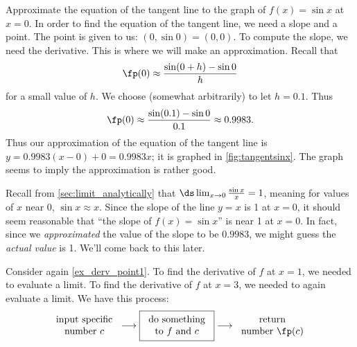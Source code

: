 \begin{example}\label{ex_der_num_approx}
Approximate the equation of the tangent line to the graph of $f(x)=\sin x$ at $x=0$.
\solution
In order to find the equation of the tangent line, we need a slope and a point. The point is given to us: $(0,\sin 0) = (0,0)$. To compute the slope, we need the derivative. This is where we will make an approximation. Recall that
\[\fp(0) \approx \frac{\sin(0+h)- \sin 0}{h}\]
for a small value of $h$. We choose (somewhat arbitrarily) to let $h=0.1$. Thus
%
%
\[\fp(0) \approx \frac{\sin(0.1)-\sin 0}{0.1} \approx 0.9983.\]
Thus our approximation of the equation of the tangent line is $y = 0.9983(x-0) +0 = 0.9983x$; it is graphed in \autoref{fig:tangentsinx}. The graph seems to imply the approximation is rather good.
\end{example}

Recall from \autoref{sec:limit_analytically} that $\ds \lim_{x\to 0}\frac{\sin x}x =1$, meaning for values of $x$ near 0, $\sin x \approx x$. Since the slope of the line $y=x$ is 1 at $x=0$, it should seem reasonable that ``the slope of $f(x)=\sin x$'' is near 1 at $x=0$. In fact, since we \emph{approximated} the value of the slope to be $0.9983$, we might guess the \emph{actual value} is 1. We'll come back to this later.\bigskip

Consider again \autoref{ex_derv_point1}. To find the derivative of $f$ at $x=1$, we needed to evaluate a limit. To find the derivative of $f$ at $x=3$, we needed to again evaluate a limit. We have this process:
\[
\begin{tabular}{c}input specific\\number $c$\end{tabular}
\longrightarrow
\fbox{\begin{tabular}{c}do something\\to $f$ and $c$\end{tabular}}
\longrightarrow
\begin{tabular}{c}return\\number $\fp(c)$\end{tabular}
\]

